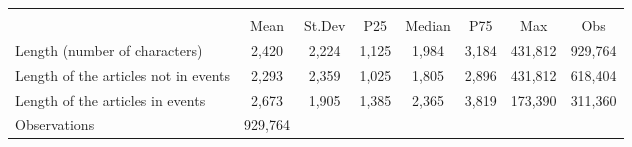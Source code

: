 {
\def\sym#1{\ifmmode^{#1}\else\(^{#1}\)\fi}
\begin{tabular}{l*{1}{ccccccc}}
\hline\hline
                    &\multicolumn{7}{c}{}                                                                      \\
                    &        Mean&      St.Dev&         P25&      Median&         P75&         Max&         Obs\\
\hline
Length (number of characters)&       2,420&       2,224&       1,125&       1,984&       3,184&     431,812&     929,764\\
Length of the articles not in events&       2,293&       2,359&       1,025&       1,805&       2,896&     431,812&     618,404\\
Length of the articles in events&       2,673&       1,905&       1,385&       2,365&       3,819&     173,390&     311,360\\
\hline
Observations        &     929,764&            &            &            &            &            &            \\
\hline\hline
\end{tabular}
}
